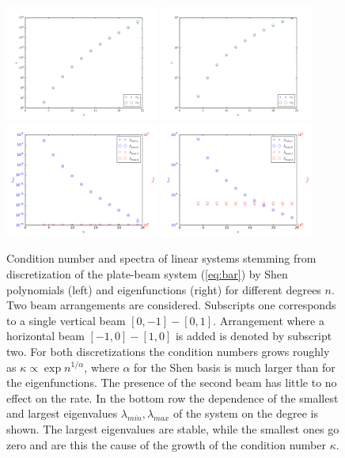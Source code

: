 \documentclass{marine_2015}
\begin{document}
 \begin{figure}[ht]
 \centering
 \includegraphics[width=0.45\textwidth]{img/shen_cond}
 \includegraphics[width=0.45\textwidth]{img/sine_cond}\\
 \includegraphics[width=0.45\textwidth]{img/shen_spectrum}
 \includegraphics[width=0.45\textwidth]{img/sine_spectrum}\\
 \caption{Condition number and spectra of linear systems stemming from
 discretization of the plate-beam system (\ref{eq:bar}) by Shen polynomials
 (left) and eigenfunctions (right) for different degrees $n$. Two beam arrangements 
 are considered. Subscripts one corresponds to a single vertical beam
 $\left[0, -1\right]-\left[0, 1\right]$. Arrangement where a horizontal beam 
$\left[-1, 0\right]-\left[1, 0\right]$ is added is denoted by subscript two.
For both discretizations the condition numbers grows roughly as
$\kappa\propto\exp{n^{1/\alpha}}$, where $\alpha$ for the Shen basis is much
larger than for the eigenfunctions. The presence of the second beam has little to
no effect on the rate. In the bottom row the dependence of the smallest and largest
eigenvalues $\lambda_{min}, \lambda_{max}$ of the system on the degree is shown. 
The largest eigenvalues are stable, while the smallest ones go zero and are this 
the cause of the growth of the condition number $\kappa$.
 }
 \label{fig:no_precon}
 \end{figure}
 
\end{document}
